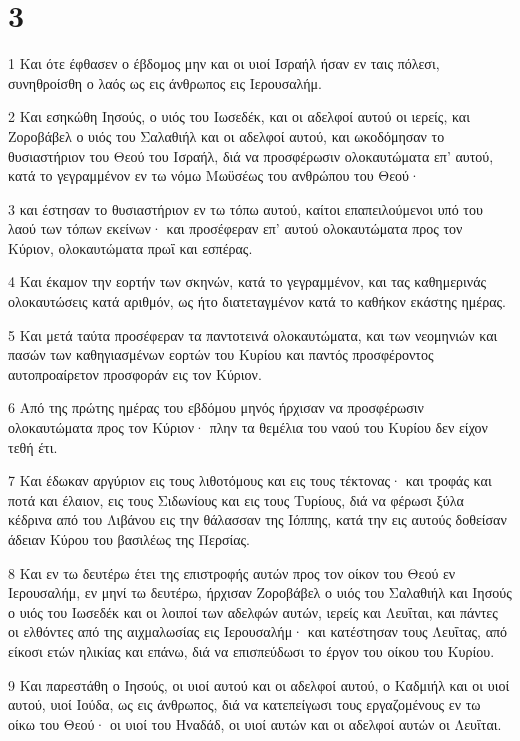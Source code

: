 \chapter{3}

\par 1 Και ότε έφθασεν ο έβδομος μην και οι υιοί Ισραήλ ήσαν εν ταις πόλεσι, συνηθροίσθη ο λαός ως εις άνθρωπος εις Ιερουσαλήμ.
\par 2 Και εσηκώθη Ιησούς, ο υιός του Ιωσεδέκ, και οι αδελφοί αυτού οι ιερείς, και Ζοροβάβελ ο υιός του Σαλαθιήλ και οι αδελφοί αυτού, και ωκοδόμησαν το θυσιαστήριον του Θεού του Ισραήλ, διά να προσφέρωσιν ολοκαυτώματα επ' αυτού, κατά το γεγραμμένον εν τω νόμω Μωϋσέως του ανθρώπου του Θεού·
\par 3 και έστησαν το θυσιαστήριον εν τω τόπω αυτού, καίτοι επαπειλούμενοι υπό του λαού των τόπων εκείνων· και προσέφεραν επ' αυτού ολοκαυτώματα προς τον Κύριον, ολοκαυτώματα πρωΐ και εσπέρας.
\par 4 Και έκαμον την εορτήν των σκηνών, κατά το γεγραμμένον, και τας καθημερινάς ολοκαυτώσεις κατά αριθμόν, ως ήτο διατεταγμένον κατά το καθήκον εκάστης ημέρας.
\par 5 Και μετά ταύτα προσέφεραν τα παντοτεινά ολοκαυτώματα, και των νεομηνιών και πασών των καθηγιασμένων εορτών του Κυρίου και παντός προσφέροντος αυτοπροαίρετον προσφοράν εις τον Κύριον.
\par 6 Από της πρώτης ημέρας του εβδόμου μηνός ήρχισαν να προσφέρωσιν ολοκαυτώματα προς τον Κύριον· πλην τα θεμέλια του ναού του Κυρίου δεν είχον τεθή έτι.
\par 7 Και έδωκαν αργύριον εις τους λιθοτόμους και εις τους τέκτονας· και τροφάς και ποτά και έλαιον, εις τους Σιδωνίους και εις τους Τυρίους, διά να φέρωσι ξύλα κέδρινα από του Λιβάνου εις την θάλασσαν της Ιόππης, κατά την εις αυτούς δοθείσαν άδειαν Κύρου του βασιλέως της Περσίας.
\par 8 Και εν τω δευτέρω έτει της επιστροφής αυτών προς τον οίκον του Θεού εν Ιερουσαλήμ, εν μηνί τω δευτέρω, ήρχισαν Ζοροβάβελ ο υιός του Σαλαθιήλ και Ιησούς ο υιός του Ιωσεδέκ και οι λοιποί των αδελφών αυτών, ιερείς και Λευΐται, και πάντες οι ελθόντες από της αιχμαλωσίας εις Ιερουσαλήμ· και κατέστησαν τους Λευΐτας, από είκοσι ετών ηλικίας και επάνω, διά να επισπεύδωσι το έργον του οίκου του Κυρίου.
\par 9 Και παρεστάθη ο Ιησούς, οι υιοί αυτού και οι αδελφοί αυτού, ο Καδμιήλ και οι υιοί αυτού, υιοί Ιούδα, ως εις άνθρωπος, διά να κατεπείγωσι τους εργαζομένους εν τω οίκω του Θεού· οι υιοί του Ηναδάδ, οι υιοί αυτών και οι αδελφοί αυτών οι Λευΐται.
